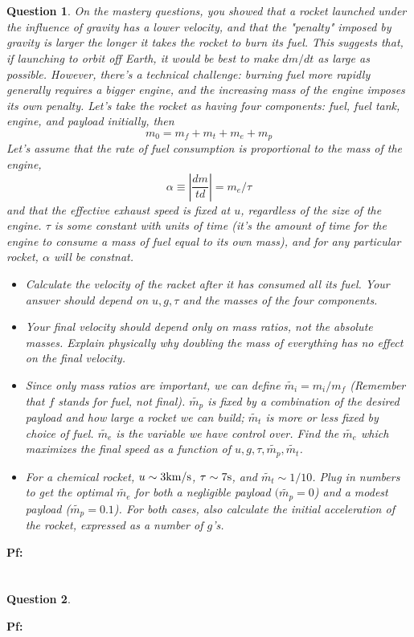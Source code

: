 \documentclass{article}
\newtheorem{question}{Question}
\begin{document}
\section{}%
\begin{question}\label{q5}
    On the mastery questions, you showed that a rocket launched under the influence of gravity has a lower velocity, and that the "penalty" imposed by gravity is larger the longer it takes the rocket to burn its fuel. This suggests that, if launching to orbit off Earth, it would be best to make $dm/dt$ as large as possible. However, there's a technical challenge: burning fuel more rapidly generally requires a bigger engine, and the increasing mass of the engine imposes its own penalty. Let's take the rocket as having four components: fuel, fuel tank, engine, and payload initially, then 
    $$m_0 = m_f + m_t+m_e+m_p$$
    Let's assume that the rate of fuel consumption is proportional to the mass of the engine, 
    $$\alpha \equiv \left|\frac{dm}{td}\right|=m_e/\tau$$
    and that the effective exhaust speed is fixed at $u$, regardless of the size of the engine. $\tau$ is some constant with units of time (it's the amount of time for the engine to consume a mass of fuel equal to its own mass), and for any particular rocket, $\alpha$ will be constnat.
    \begin{itemize}
        \item[(a)] Calculate the velocity of the racket after it has consumed all its fuel. Your answer should depend on $u,g,\tau$ and the masses of the four components.
        \item[(b)] Your final velocity should depend only on mass ratios, not the absolute masses. Explain physically why doubling the mass of everything has no effect on the final velocity.
        \item[(c)]Since only mass ratios are important, we can define $\tilde{m_i} = m_i/m_f$ (Remember that $f$ stands for fuel, not final). $\tilde{m_p}$ is fixed by a combination of the desired payload and how large a rocket we can build; $\tilde{m_t}$ is more or less fixed by choice of fuel. $\tilde{m_e}$ is the variable we have control over. Find the $\tilde{m_e}$ which maximizes the final speed as a function of $u,g,\tau,\tilde{m_p},\tilde{m_t}$.
        \item[(d)]For a chemical rocket, $u\sim 3 \textmd{km/s}$, $\tau\sim 7\textmd{s}$, and $\tilde{m_t}\sim 1/10$. Plug in numbers to get the optimal $\tilde{m_e}$ for both a negligible payload $(\tilde{m_p}=0$) and a modest payload ($\tilde{m_p}=0.1$). For both cases, also calculate the initial acceleration of the rocket, expressed as a number of $g$'s. 
    \end{itemize}
\end{question}

\textbf{Pf:}

\break

\section{}%
\begin{question}\label{q6}
\end{question}

\textbf{Pf:}
\end{document}
